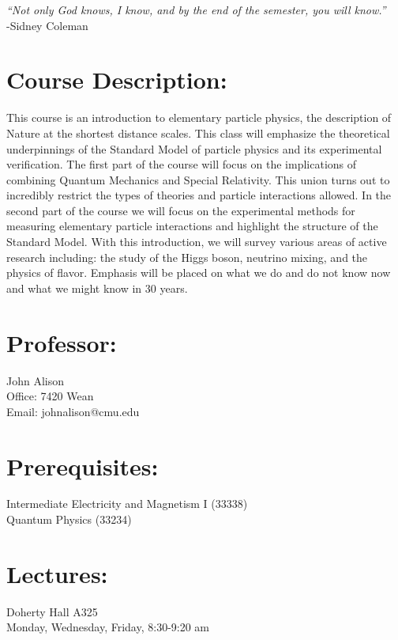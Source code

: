 \documentclass[margin,line]{res}
\begin{document}


\begin{resume}
{ \textit{\large``Not only God knows, I know, and by the end of the semester, you will know.''}\\ \hspace*{5in} -Sidney Coleman}

\section{Course Description:}
This course is an introduction to elementary particle physics, the description of Nature at the shortest distance scales. 
This class will emphasize the theoretical underpinnings of the Standard Model of particle physics and its experimental verification.
The first part of the course will focus on the implications of combining Quantum Mechanics and Special Relativity.
This union turns out to incredibly restrict the types of theories and particle interactions allowed.
In the second part of the course we will focus on the experimental methods for measuring elementary particle interactions and highlight the structure of the Standard Model.
With this introduction, we will survey various areas of active research including: the study of the Higgs boson, neutrino mixing, and the physics of flavor. 
Emphasis will be placed on what we do and do not know now and what we might know in 30 years.


\section{Professor:}
John Alison\\
Office: 7420 Wean\\
Email: johnalison@cmu.edu

\section{Prerequisites:} 
Intermediate Electricity and Magnetism I (33338)\\
Quantum Physics (33234)

\section{Lectures:}
Doherty Hall A325\\
 Monday, Wednesday,  Friday, 8:30-9:20 am 


\end{resume}
\end{document}
